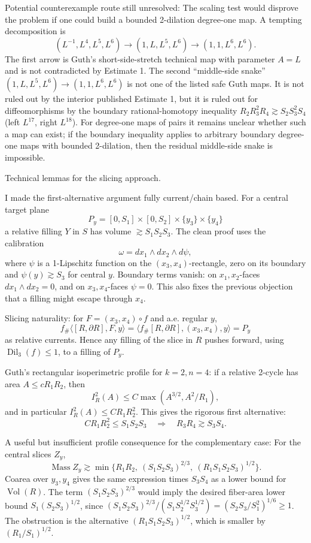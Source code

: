 \documentclass[12pt]{article}
\newcommand{\Dil}{\operatorname{Dil}}
\newcommand{\Vol}{\operatorname{Vol}}
\newcommand{\Mass}{\operatorname{Mass}}
\begin{document}
Potential counterexample route still unresolved:
The scaling test would disprove the problem if one could build a bounded
2-dilation degree-one map.  A tempting decomposition is
\[
(L^{-1},L^4,L^5,L^6)\to(1,L,L^5,L^6)\to(1,1,L^6,L^6).
\]
The first arrow is Guth's short-side-stretch technical map with parameter \(A=L\)
and is not contradicted by Estimate 1.  The second ``middle-side snake''
\((1,L,L^5,L^6)\to(1,1,L^6,L^6)\) is not one of the listed safe Guth maps.  It is not
ruled out by the interior published Estimate 1, but it is ruled out for diffeomorphisms
by the boundary rational-homotopy inequality
\(R_2R_3^2R_4\gtrsim S_2S_3^2S_4\) (left \(L^{17}\), right \(L^{18}\)).  For degree-one
maps of pairs it remains unclear whether such a map can exist; if the boundary
inequality applies to arbitrary boundary degree-one maps with bounded 2-dilation,
then the residual middle-side snake is impossible.



Technical lemmas for the slicing approach.

I made the first-alternative argument fully current/chain based.  For a central
target plane
\[
P_y=[0,S_1]\times[0,S_2]\times\{y_3\}\times\{y_4\}
\]
a relative filling \(Y\) in \(S\) has volume \(\gtrsim S_1S_2S_3\).  The clean
proof uses the calibration
\[
\omega=dx_1\wedge dx_2\wedge d\psi,
\]
where \(\psi\) is a 1-Lipschitz function on the \((x_3,x_4)\)-rectangle, zero on
its boundary and \(\psi(y)\gtrsim S_3\) for central \(y\).  Boundary terms vanish:
on \(x_1,x_2\)-faces \(dx_1\wedge dx_2=0\), and on \(x_3,x_4\)-faces
\(\psi=0\).  This also fixes the previous objection that a filling might escape
through \(x_4\).

Slicing naturality: for \(F=(x_3,x_4)\circ f\) and a.e. regular \(y\),
\[
f_\#\langle [R,\partial R],F,y\rangle
=\langle f_\#[R,\partial R],(x_3,x_4),y\rangle
=P_y
\]
as relative currents.  Hence any filling of the slice in \(R\) pushes forward,
using \(\Dil_3(f)\le1\), to a filling of \(P_y\).

Guth's rectangular isoperimetric profile for \(k=2,n=4\): if a relative
2-cycle has area \(A\le cR_1R_2\), then
\[
I_R^2(A)\le C\max(A^{3/2},A^2/R_1),
\]
and in particular \(I_R^2(A)\le CR_1R_2^2\).  This gives the rigorous first
alternative:
\[
CR_1R_2^2\le S_1S_2S_3\quad\Longrightarrow\quad R_3R_4\gtrsim S_3S_4.
\]

A useful but insufficient profile consequence for the complementary case:
For the central slices \(Z_y\),
\[
\Mass Z_y\gtrsim
\min\{R_1R_2,\ (S_1S_2S_3)^{2/3},\ (R_1S_1S_2S_3)^{1/2}\}.
\]
Coarea over \(y_3,y_4\) gives the same expression times \(S_3S_4\) as a lower
bound for \(\Vol(R)\).  The term \((S_1S_2S_3)^{2/3}\) would imply the desired
fiber-area lower bound \(S_1(S_2S_3)^{1/2}\), since
\((S_1S_2S_3)^{2/3}/(S_1S_2^{1/2}S_3^{1/2})
=(S_2S_3/S_1^2)^{1/6}\ge1\).  The obstruction is the alternative
\((R_1S_1S_2S_3)^{1/2}\), which is smaller by \((R_1/S_1)^{1/2}\).
\end{document}

